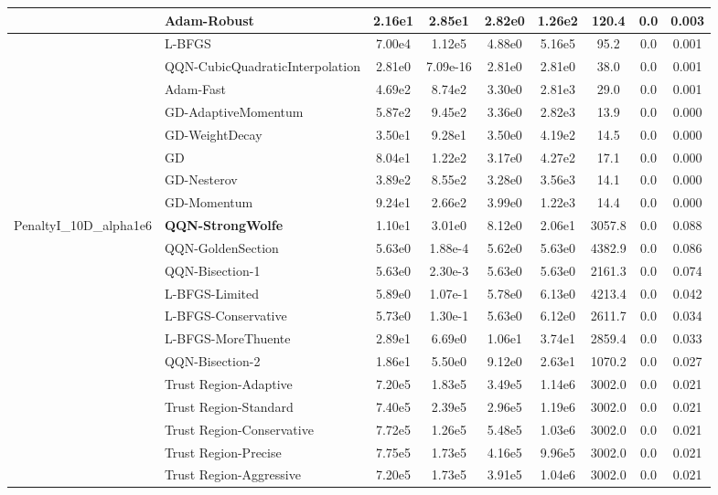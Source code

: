 \documentclass[10pt]{article}
\begin{document}
\begin{longtable}{|l|l|c|c|c|c|c|c|c|}
\hline
 & Adam-Robust & 2.16e1 & 2.85e1 & 2.82e0 & 1.26e2 & 120.4 & 0.0 & 0.003 \\
\hline
 & L-BFGS & 7.00e4 & 1.12e5 & 4.88e0 & 5.16e5 & 95.2 & 0.0 & 0.001 \\
\hline
 & QQN-CubicQuadraticInterpolation & 2.81e0 & 7.09e-16 & 2.81e0 & 2.81e0 & 38.0 & 0.0 & 0.001 \\
\hline
 & Adam-Fast & 4.69e2 & 8.74e2 & 3.30e0 & 2.81e3 & 29.0 & 0.0 & 0.001 \\
\hline
 & GD-AdaptiveMomentum & 5.87e2 & 9.45e2 & 3.36e0 & 2.82e3 & 13.9 & 0.0 & 0.000 \\
\hline
 & GD-WeightDecay & 3.50e1 & 9.28e1 & 3.50e0 & 4.19e2 & 14.5 & 0.0 & 0.000 \\
\hline
 & GD & 8.04e1 & 1.22e2 & 3.17e0 & 4.27e2 & 17.1 & 0.0 & 0.000 \\
\hline
 & GD-Nesterov & 3.89e2 & 8.55e2 & 3.28e0 & 3.56e3 & 14.1 & 0.0 & 0.000 \\
\hline
 & GD-Momentum & 9.24e1 & 2.66e2 & 3.99e0 & 1.22e3 & 14.4 & 0.0 & 0.000 \\
PenaltyI\_10D\_alpha1e6 & \textbf{QQN-StrongWolfe} & 1.10e1 & 3.01e0 & 8.12e0 & 2.06e1 & 3057.8 & 0.0 & 0.088 \\
\hline
 & QQN-GoldenSection & 5.63e0 & 1.88e-4 & 5.62e0 & 5.63e0 & 4382.9 & 0.0 & 0.086 \\
\hline
 & QQN-Bisection-1 & 5.63e0 & 2.30e-3 & 5.63e0 & 5.63e0 & 2161.3 & 0.0 & 0.074 \\
\hline
 & L-BFGS-Limited & 5.89e0 & 1.07e-1 & 5.78e0 & 6.13e0 & 4213.4 & 0.0 & 0.042 \\
\hline
 & L-BFGS-Conservative & 5.73e0 & 1.30e-1 & 5.63e0 & 6.12e0 & 2611.7 & 0.0 & 0.034 \\
\hline
 & L-BFGS-MoreThuente & 2.89e1 & 6.69e0 & 1.06e1 & 3.74e1 & 2859.4 & 0.0 & 0.033 \\
\hline
 & QQN-Bisection-2 & 1.86e1 & 5.50e0 & 9.12e0 & 2.63e1 & 1070.2 & 0.0 & 0.027 \\
\hline
 & Trust Region-Adaptive & 7.20e5 & 1.83e5 & 3.49e5 & 1.14e6 & 3002.0 & 0.0 & 0.021 \\
\hline
 & Trust Region-Standard & 7.40e5 & 2.39e5 & 2.96e5 & 1.19e6 & 3002.0 & 0.0 & 0.021 \\
\hline
 & Trust Region-Conservative & 7.72e5 & 1.26e5 & 5.48e5 & 1.03e6 & 3002.0 & 0.0 & 0.021 \\
\hline
 & Trust Region-Precise & 7.75e5 & 1.73e5 & 4.16e5 & 9.96e5 & 3002.0 & 0.0 & 0.021 \\
\hline
 & Trust Region-Aggressive & 7.20e5 & 1.73e5 & 3.91e5 & 1.04e6 & 3002.0 & 0.0 & 0.021 \\

\end{longtable}
\end{document}
